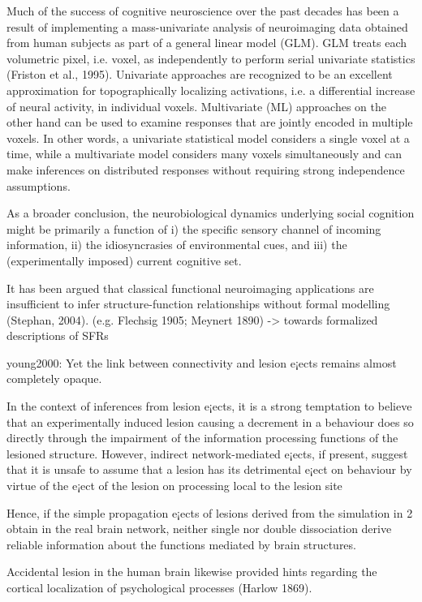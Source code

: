 \documentclass[authoryear,review,3p]{elsarticle}
\begin{document}
Much of the success of cognitive neuroscience over the past decades has been a result of implementing a mass-univariate analysis of neuroimaging data obtained from human subjects as part of a general linear model (GLM). GLM treats each volumetric pixel, i.e. voxel, as independently to perform serial univariate statistics (Friston et al., 1995). 
Univariate approaches are recognized to be an excellent approximation for topographically localizing activations, i.e. a differential increase of neural activity, in individual voxels. Multivariate (ML) approaches on the other hand can be used to examine responses that are jointly encoded in multiple voxels. In other words, a univariate statistical model considers a single voxel at a time, while a multivariate model considers many voxels simultaneously and can make inferences on distributed responses without requiring strong independence assumptions. 

As a broader conclusion, the neurobiological dynamics underlying social cognition might be primarily a function of i) the specific sensory channel of incoming information, ii) the idiosyncrasies of environmental cues, and iii) the (experimentally imposed) current cognitive set.



It has been argued that classical functional neuroimaging applications
are insufficient to infer structure-function relationships
without formal modelling (Stephan, 2004).
(e.g. Flechsig 1905; Meynert 1890)
-> towards formalized descriptions of SFRs

young2000:
Yet the link between connectivity and lesion e¡ects remains almost completely opaque.

In the context of inferences from lesion e¡ects, it is a strong temptation to believe that an experimentally induced lesion causing a decrement in a behaviour does so directly through the impairment of the information processing functions of the lesioned structure. However, indirect network-mediated e¡ects, if present, suggest that it is unsafe to assume that a lesion has its detrimental e¡ect on behaviour by virtue of the e¡ect of the lesion on processing local to the lesion site

Hence, if the simple propagation e¡ects of lesions derived from the simulation in 2 obtain in the real brain network, neither single nor double dissociation derive reliable information about the functions mediated by brain structures.

Accidental lesion in the human brain likewise provided hints regarding the cortical localization of psychological processes (Harlow 1869). 
\end{document}
